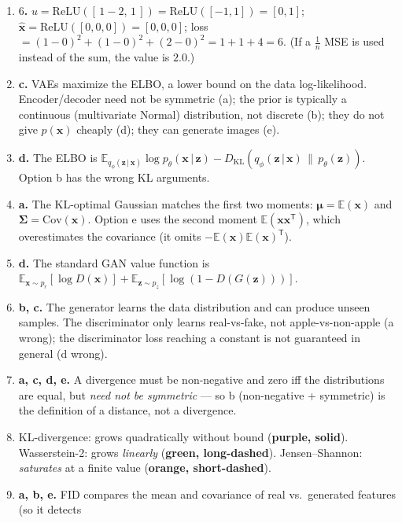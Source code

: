 \documentclass[11pt,oneside]{article}
\newcommand{\E}{\mathbb{E}}
\newcommand{\KL}[2]{D_{\mathrm{KL}}\!\left(#1\,\|\,#2\right)}
\newcommand{\Cov}{\mathrm{Cov}}
\newcommand{\given}{\,\vert\,}
\newcommand{\T}{^{\mathsf{T}}}
\begin{document}
\begin{enumerate}[label=\textbf{Q\arabic*.}, leftmargin=3em, itemsep=4pt]
        (d wrong), does not rely on early stopping (e wrong), and sparsity and denoising can be combined (f wrong).
  \item \textbf{$6$.} $u=\mathrm{ReLU}([\,1-2,\,1\,])=\mathrm{ReLU}([-1,1])=[0,1]$;
        $\hat{\mathbf{x}}=\mathrm{ReLU}([0,0,0])=[0,0,0]$; loss $=(1{-}0)^2+(1{-}0)^2+(2{-}0)^2=1+1+4=6$.
        (If a $\tfrac1n$ MSE is used instead of the sum, the value is $2.0$.)
  \item \textbf{c.} VAEs maximize the ELBO, a lower bound on the data log-likelihood. Encoder/decoder need
        not be symmetric (a); the prior is typically a continuous (multivariate Normal) distribution, not
        discrete (b); they do not give $p(\mathbf{x})$ cheaply (d); they can generate images (e).
  \item \textbf{d.} The ELBO is
        $\E_{q_\phi(\mathbf{z}\given\mathbf{x})}\log p_\theta(\mathbf{x}\given\mathbf{z})
        -\KL{q_\phi(\mathbf{z}\given\mathbf{x})}{p_\theta(\mathbf{z})}$. Option b has the wrong KL arguments.
  \item \textbf{a.} The KL-optimal Gaussian matches the first two moments: $\boldsymbol\mu=\E(\mathbf{x})$
        and $\boldsymbol\Sigma=\Cov(\mathbf{x})$. Option e uses the second moment $\E(\mathbf{x}\mathbf{x}\T)$,
        which overestimates the covariance (it omits $-\E(\mathbf{x})\E(\mathbf{x})\T$).
  \item \textbf{d.} The standard GAN value function is
        $\E_{\mathbf{x}\sim p_r}[\log D(\mathbf{x})]+\E_{\mathbf{z}\sim p_z}[\log(1-D(G(\mathbf{z})))]$.
  \item \textbf{b, c.} The generator learns the data distribution and can produce unseen samples. The
        discriminator only learns real-vs-fake, not apple-vs-non-apple (a wrong); the discriminator loss
        reaching a constant is not guaranteed in general (d wrong).
  \item \textbf{a, c, d, e.} A divergence must be non-negative and zero iff the distributions are equal, but
        \emph{need not be symmetric} --- so b (non-negative + symmetric) is the definition of a distance, not
        a divergence.
  \item KL-divergence: grows quadratically without bound (\textbf{purple, solid}). Wasserstein-2: grows
        \emph{linearly} (\textbf{green, long-dashed}). Jensen--Shannon: \emph{saturates} at a finite value
        (\textbf{orange, short-dashed}).
  \item \textbf{a, b, e.} FID compares the mean and covariance of real vs.\ generated features (so it detects

\end{enumerate}
\end{document}
